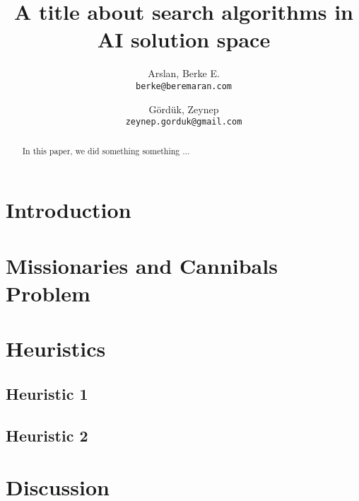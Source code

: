 \documentclass[11pt,english]{article}
\title{A title about search algorithms in AI solution space}
\author{
	Arslan, Berke E.\\
	\texttt{berke@beremaran.com}
	\and
	Gördük, Zeynep\\
	\texttt{zeynep.gorduk@gmail.com}
}
\begin{document}
\maketitle

\begin{abstract}
In this paper, we did something something ...
\end{abstract}

\section{Introduction}
\section{Missionaries and Cannibals Problem}
\section{Heuristics}
\subsection{Heuristic 1}
\subsection{Heuristic 2}
\section{Discussion}
\end{document}
